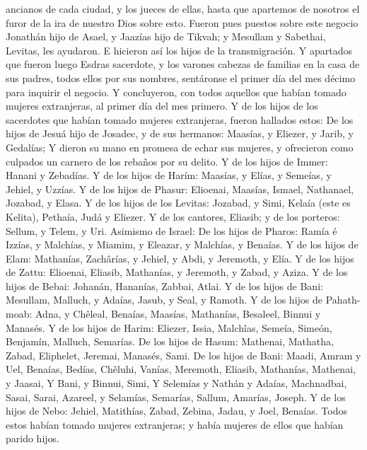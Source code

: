 ancianos de cada ciudad, y los jueces de ellas, hasta que apartemos de
nosotros el furor de la ira de nuestro Dios sobre esto. 
Fueron pues puestos sobre este negocio Jonathán hijo de Asael, y Jaazías
hijo de Tikvah; y Mesullam y Sabethai, Levitas, les ayudaron.
 E hicieron así los hijos de la transmigración. Y apartados
que fueron luego Esdras sacerdote, y los varones cabezas de familias en
la casa de sus padres, todos ellos por sus nombres, sentáronse el primer
día del mes décimo para inquirir el negocio.  Y
concluyeron, con todos aquellos que habían tomado mujeres extranjeras,
al primer día del mes primero.  Y de los hijos de los
sacerdotes que habían tomado mujeres extranjeras, fueron hallados estos:
De los hijos de Jesuá hijo de Josadec, y de sus hermanos: Maasías, y
Eliezer, y Jarib, y Gedalías;  Y dieron su mano en promesa
de echar sus mujeres, y ofrecieron como culpados un carnero de los
rebaños por su delito.  Y de los hijos de Immer: Hanani y
Zebadías.  Y de los hijos de Harím: Maasías, y Elías, y
Semeías, y Jehiel, y Uzzías.  Y de los hijos de Phasur:
Elioenai, Maasías, Ismael, Nathanael, Jozabad, y Elasa.  Y
de los hijos de los Levitas: Jozabad, y Simi, Kelaía (este es Kelita),
Pethaía, Judá y Eliezer.  Y de los cantores, Eliasib; y de
los porteros: Sellum, y Telem, y Uri.  Asimismo de Israel:
De los hijos de Pharos: Ramía é Izzías, y Malchías, y Miamim, y Eleazar,
y Malchías, y Benaías.  Y de los hijos de Elam: Mathanías,
Zachârías, y Jehiel, y Abdi, y Jeremoth, y Elía.  Y de los
hijos de Zattu: Elioenai, Eliasib, Mathanías, y Jeremoth, y Zabad, y
Aziza.  Y de los hijos de Bebai: Johanán, Hananías, Zabbai,
Atlai.  Y de los hijos de Bani: Mesullam, Malluch, y
Adaías, Jasub, y Seal, y Ramoth.  Y de los hijos de
Pahath-moab: Adna, y Chêleal, Benaías, Maasías, Mathanías, Besaleel,
Binnui y Manasés.  Y de los hijos de Harim: Eliezer, Issia,
Malchîas, Semeía, Simeón,  Benjamín, Malluch, Semarías.
 De los hijos de Hasum: Mathenai, Mathatha, Zabad,
Eliphelet, Jeremai, Manasés, Sami.  De los hijos de Bani:
Maadi, Amram y Uel,  Benaías, Bedías, Chêluhi,
 Vanías, Meremoth, Eliasib,  Mathanías,
Mathenai, y Jaasai,  Y Bani, y Binnui, Simi, 
Y Selemías y Nathán y Adaías,  Machnadbai, Sasai, Sarai,
 Azareel, y Selamías, Semarías,  Sallum,
Amarías, Joseph.  Y de los hijos de Nebo: Jehiel,
Matithías, Zabad, Zebina, Jadau, y Joel, Benaías.  Todos
estos habían tomado mujeres extranjeras; y había mujeres de ellos que
habían parido hijos.
